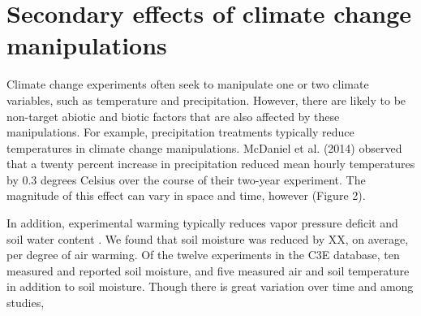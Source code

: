 \documentclass{article}
\begin{document}
\section* {Secondary effects of climate change manipulations}
Climate change experiments often seek to manipulate one or two climate variables, such as temperature and precipitation. However, there are likely to be non-target abiotic and biotic factors that are also affected by these manipulations. For example, precipitation treatments typically reduce temperatures in climate change manipulations\citep{sherry2007,rollinson2012,mcdaniel2014}. McDaniel et al. (2014) observed that a twenty percent increase in precipitation reduced mean hourly temperatures by 0.3 degrees Celsius over the course of their two-year experiment. The magnitude of this effect can vary in space and time, however (Figure 2). 
\par In addition, experimental warming typically reduces vapor pressure deficit and soil water content \citep[e.g. Figure 4][]{sherry2007,morin2010,templer2016}. We found that soil moisture was reduced by XX, on average, per degree of air warming. Of the twelve experiments in the C3E database, ten measured and reported soil moisture, and five measured air and soil temperature in addition to soil moisture. Though there is great variation over time and among studies, %
\end{document}
